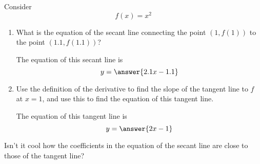 \documentclass{ximera}
\author{Steven Gubkin}
\begin{document}
\begin{exercise}



Consider 
\[
f(x) = x^2
\]



\begin{enumerate}
\item What is the equation of the secant line connecting the point $(1,f(1))$ to the point $(1.1,f(1.1))$? 
\begin{prompt} 
The equation of this secant line is
$$ y = \answer{ 2.1x - 1.1}$$ 
\end{prompt}

\item  Use the definition of the derivative to find the slope of the tangent line to $f$ at $x=1$, and use this to find the equation of this tangent line.

\begin{prompt} 
The equation of this tangent line is
$$ y = \answer{ 2x - 1}$$ 
\end{prompt}

\end{enumerate}

Isn't it cool how the coefficients in the equation of the secant line are close to those of the tangent line?
\end{exercise}
\end{document}
